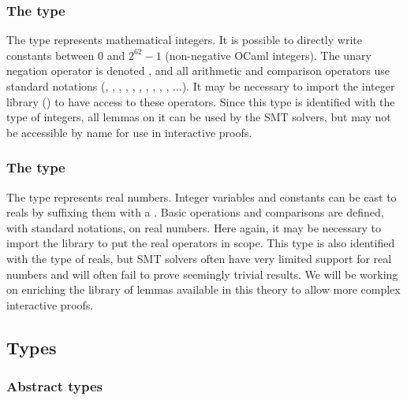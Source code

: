 \subsubsection*{The  type}
The  type represents mathematical integers. It is possible to
directly write constants between $0$ and $2^{62} - 1$ (non-negative OCaml
integers). The unary negation operator is denoted \rawec{-!}, and all arithmetic
and comparison operators use standard notations (\rawec{+}, \rawec{-},
\rawec{*}, \rawec{/}, \rawec{\%}, \rawec{^}, \rawec{=}, \rawec{<}, \rawec{<=},
\rawec{>}, \rawec{>=}...). It may be necessary to import the integer library
() to have access to these operators. Since this type
is identified with the \WhyThree type of integers, all \WhyThree lemmas on it
can be used by the SMT solvers, but may not be accessible by name for use in
interactive proofs.

\subsubsection*{The  type}
The  type represents real numbers. Integer variables and constants
can be cast to reals by suffixing them with a . Basic operations and
comparisons are defined, with standard notations, on real numbers. Here again,
it may be necessary to import the library to put the real operators in scope.
This type is also identified with the \WhyThree type of reals, but SMT solvers
often have very limited support for real numbers and will often fail to prove
seemingly trivial results.
%
We will be working on enriching the library of lemmas available in this theory
to allow more complex interactive proofs.


\subsection{Types}
\subsubsection*{Abstract types}


